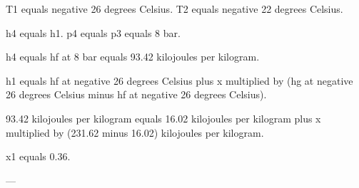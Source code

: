 T1 equals negative 26 degrees Celsius.  
T2 equals negative 22 degrees Celsius.  

h4 equals h1.  
p4 equals p3 equals 8 bar.  

h4 equals hf at 8 bar equals 93.42 kilojoules per kilogram.  

h1 equals hf at negative 26 degrees Celsius plus x multiplied by (hg at negative 26 degrees Celsius minus hf at negative 26 degrees Celsius).  

93.42 kilojoules per kilogram equals 16.02 kilojoules per kilogram plus x multiplied by (231.62 minus 16.02) kilojoules per kilogram.  

x1 equals 0.36.  

---